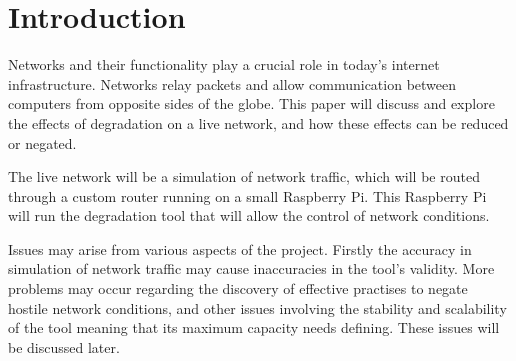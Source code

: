 \chapter{Introduction}
Networks and their functionality play a crucial role in today's internet infrastructure. Networks relay packets and allow communication between computers from opposite sides of the globe. This paper will discuss and explore the effects of degradation on a live network, and how these effects can be reduced or negated. 

The live network will be a simulation of network traffic, which will be routed through a custom router running on a small Raspberry Pi. This Raspberry Pi will run the degradation tool that will allow the control of network conditions. 

Issues may arise from various aspects of the project. Firstly the accuracy in simulation of network traffic may cause inaccuracies in the tool's validity. More problems may occur regarding the discovery of effective practises to negate hostile network conditions, and other issues involving the stability and scalability of the tool meaning that its maximum capacity needs defining. These issues will be discussed later.
